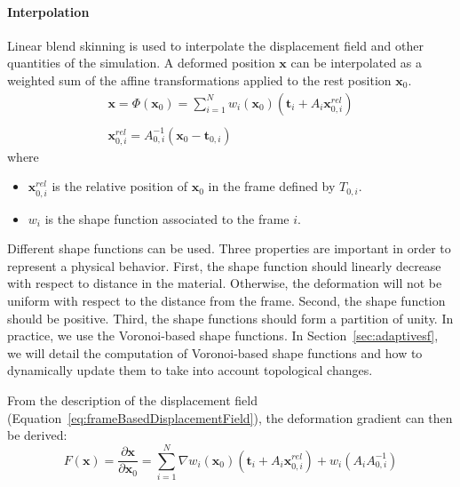\paragraph{Interpolation}
Linear blend skinning is used to interpolate the displacement field and other quantities of the simulation. 
A deformed position $\mathbf{x}$ can be interpolated as a weighted sum of the affine transformations applied to the rest position $\mathbf{x}_{0}$.
\begin{equation}
\label{eq:frameBasedDisplacementField}
\begin{array}{l}
\displaystyle \mathbf{x} = \Phi(\mathbf{x}_{0}) = \sum_{i=1}^{N} w_{i}(\mathbf{x}_{0})\left(\mathbf{t}_{i}+A_{i}\mathbf{x}_{0,i}^{rel}\right) \\ \\
\displaystyle \mathbf{x}_{0,i}^{rel} = A_{0,i}^{-1}\left( \mathbf{x}_{0} - \mathbf{t}_{0,i} \right)
\end{array}
\end{equation}
where 
\begin{itemize}
\item $\mathbf{x}_{0,i}^{rel}$ is the relative position of $\mathbf{x}_{0}$ in the frame defined by $T_{0,i}$.
\item $w_{i}$ is the shape function associated to the frame $i$.
\end{itemize}
Different shape functions can be used. Three properties are important in order to represent a physical behavior. 
First, the shape function should linearly decrease with respect to distance in the material. 
Otherwise, the deformation will not be uniform with respect to the distance from the frame. 
Second, the shape function should be positive. 
Third, the shape functions should form a partition of unity. 
In practice, we use the Voronoi-based shape functions.
In Section~\ref{sec:adaptivesf}, we will detail the computation of Voronoi-based shape functions and how to dynamically update them to take into account topological changes.

From the description of the displacement field (Equation~\eqref{eq:frameBasedDisplacementField}), the deformation gradient can then be derived:
\begin{equation}
\displaystyle
F\left(\mathbf{x}\right) = 
\frac{\partial \mathbf{x}}{\partial \mathbf{x}_{0}} =
\sum_{i=1}^{N} \nabla w_{i}(\mathbf{x}_{0}) \left( \mathbf{t}_{i}+A_{i}\mathbf{x}_{0,i}^{rel}\right) + 
w_{i}\left( A_{i}A_{0,i}^{-1} \right)
\end{equation}

